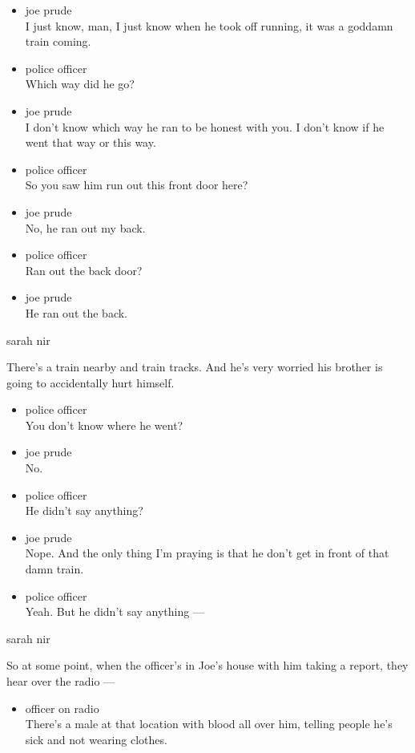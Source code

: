 \begin{itemize}
\item
  joe prude\\
  I just know, man, I just know when he took off running, it was a
  goddamn train coming.
\item
  police officer\\
  Which way did he go?
\item
  joe prude\\
  I don't know which way he ran to be honest with you. I don't know if
  he went that way or this way.
\item
  police officer\\
  So you saw him run out this front door here?
\item
  joe prude\\
  No, he ran out my back.
\item
  police officer\\
  Ran out the back door?
\item
  joe prude\\
  He ran out the back.
\end{itemize}

sarah nir

There's a train nearby and train tracks. And he's very worried his
brother is going to accidentally hurt himself.

\begin{itemize}
\item
  police officer\\
  You don't know where he went?
\item
  joe prude\\
  No.
\item
  police officer\\
  He didn't say anything?
\item
  joe prude\\
  Nope. And the only thing I'm praying is that he don't get in front of
  that damn train.
\item
  police officer\\
  Yeah. But he didn't say anything ---
\end{itemize}

sarah nir

So at some point, when the officer's in Joe's house with him taking a
report, they hear over the radio ---

\begin{itemize}
\tightlist
\item
  officer on radio\\
  There's a male at that location with blood all over him, telling
  people he's sick and not wearing clothes.
\end{itemize}

